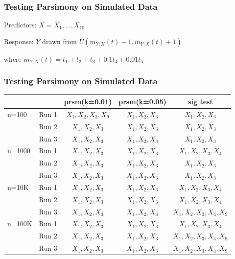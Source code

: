 \documentclass{beamer}
\begin{document}

\author[Thomas Provan]{C. Patton, A. Rumbaugh, T. Provan, O. Prilepova, J. Chen}

\begin{frame}
\frametitle{Testing Parsimony on Simulated Data}

Predictors: $X = X_1,..., X_10$

Response: $Y$ drawn from $U(m_{Y;X}(t) - 1, m_{Y;X}(t) + 1)$

\vspace{1 mm}

\hspace{8 mm} where $m_{Y,X}(t) = t_1 + t_2 + t_3 + 0.1t_4 + 0.01t_5$


\end{frame}

\begin{frame}
\frametitle{Testing Parsimony on Simulated Data}

\begin{tabular}{| l  r | c | c | c |}

\hline

	&&	prsm(k=0.01)&	prsm(k=0.05)&	sig test	\\
\hline

n=100&	Run 1&	$X_1 ,X_2, X_3, X_9$&	$X_1, X_2, X_3$&		$X_1, X_2, X_3$	\\
	&	Run 2&	$X_1, X_2, X_3$&		$X_1, X_2, X_3$&		$X_1, X_2, X_3$	\\
	&	Run 3&	$X_1, X_2, X_3$&		$X_1, X_2, X_3$&		$X_1, X_2, X_3$	\\

\hline

n=1000&	Run 1&	$X_1, X_2, X_3$&		$X_1, X_2, X_3$&		$X_1, X_2, X_3, X_4$	\\
	&	Run 2&	$X_1, X_2, X_3$&		$X_1, X_2, X_3$&		$X_1, X_2, X_3$		\\
	&	Run 3&	$X_1, X_2, X_3$&		$X_1, X_2, X_3$&		$X_1, X_2, X_3$		\\
	
\hline
			
n=10K&	Run 1&	$X_1, X_2, X_3$&		$X_1, X_2, X_3$&		$X_1, X_2, X_3, X_4$		\\
	&	Run 2&	$X_1, X_2, X_3$&		$X_1, X_2, X_3$&		$X_1, X_2, X_3, X_4$		\\
	&	Run 3&	$X_1, X_2, X_3$&		$X_1, X_2, X_3$&		$X_1, X_2, X_3, X_4, X_9$		\\

\hline
			
n=100K&	Run 1&	$X_1, X_2, X_3$&		$X_1, X_2, X_3$&		$X_1, X_2, X_3, X_4$		\\
	&	Run 2&	$X_1, X_2, X_3$&		$X_1, X_2, X_3$&		$X_1, X_2, X_3, X_4, X_9$		\\
	&	Run 3&	$X_1, X_2, X_3$&		$X_1, X_2, X_3$&		$X_1, X_2, X_3, X_4, X_9$		\\

\hline

\end{tabular}


\end{frame}
\end{document}
